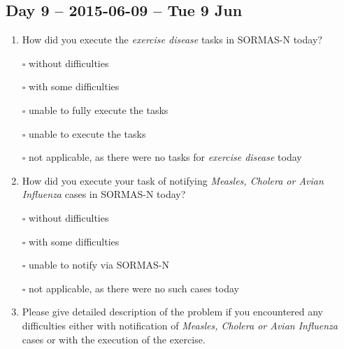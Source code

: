 \documentclass[a4paper, titlepage]{tufte-handout}
\begin{document}
\subsection{Day 9 -- 2015-06-09 -- Tue  9 Jun}
\label{sec-8-7}
\begin{enumerate}
\item How did you execute the \emph{exercise disease} tasks in SORMAS-N today?

\quad $\square$ without difficulties

\quad $\square$ with some difficulties

\quad $\square$ unable to fully execute the tasks

\quad $\square$ unable to execute the tasks

\quad $\square$ not applicable, as there were no tasks for \emph{exercise disease} today

\item How did you execute your task of notifying \emph{Measles, Cholera or Avian Influenza} cases in SORMAS-N today?

\quad $\square$ without difficulties

\quad $\square$ with some difficulties

\quad $\square$ unable to notify via SORMAS-N

\quad $\square$ not applicable, as there were no such cases today

\item Please give detailed description of the problem if you encountered any difficulties either with notification of \emph{Measles, Cholera or Avian Influenza} cases or with the execution of the exercise.

\hrulefill

\hrulefill

\hrulefill

\hrulefill

\hrulefill

\hrulefill

\hrulefill

\hrulefill

\hrulefill

\hrulefill
\end{enumerate}

\newpage
\end{document}
